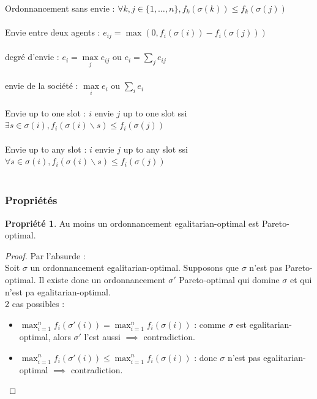 \documentclass[12pt]{article}
\theoremstyle{definition}
\newtheorem{prop}{Propriété}
\begin{document}
Ordonnancement sans envie : $\forall k,j\in \lbrace1, \dots,n\rbrace, f_k(\sigma(k))\leq f_k(\sigma(j))$\\\\
Envie entre deux agents : $e_{ij} = \max(0, f_i(\sigma(i)) - f_i(\sigma(j)))$\\\\
degré d'envie : $e_i = \max\limits_j e_{ij}$ ou $e_i = \sum\limits_j e_{ij}$\\\\
envie de la société : $\max\limits_i e_i$ ou $\sum\limits_i e_i$\\\\
Envie up to one slot : $i$ envie $j$ up to one slot ssi $\exists s\in \sigma(i), f_i(\sigma(i)\backslash s)\leq f_i(\sigma(j))$\\\\
Envie up to any slot : $i$ envie $j$ up to any slot ssi $\forall s\in \sigma(i), f_i(\sigma(i)\backslash s)\leq f_i(\sigma(j))$\\\\

\subsubsection{Propriétés}
\begin{prop}
    Au moins un ordonnancement egalitarian-optimal est Pareto-optimal.
\end{prop}

\begin{proof}
    Par l'absurde :\\
    Soit $\sigma$ un ordonnancement egalitarian-optimal. Supposons que $\sigma$ n'est pas Pareto-optimal. Il existe donc un ordonnancement $\sigma'$ Pareto-optimal qui domine $\sigma$ et qui n'est pa egalitarian-optimal.\\
    2 cas possibles : 
    \begin{itemize}
        \item $\max_{i = 1}^n f_i(\sigma'(i)) = \max_{i = 1}^n f_i(\sigma(i))$ : comme $\sigma$ est egalitarian-optimal, alors $\sigma'$ l'est aussi $\implies$ contradiction.
        \item $\max_{i = 1}^n f_i(\sigma'(i)) \leq \max_{i = 1}^n f_i(\sigma(i))$ : donc $\sigma$ n'est pas egalitarian-optimal $\implies$ contradiction.
    \end{itemize}
\end{proof}
\end{document}
